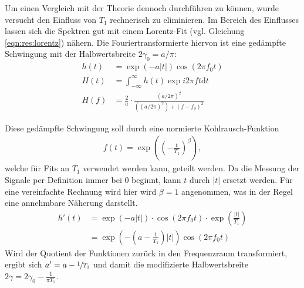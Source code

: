 Um einen Vergleich mit der Theorie dennoch durchführen zu können, wurde versucht den Einfluss von $T_1$ rechnerisch zu eliminieren. Im Bereich des Einflusses lassen sich die Spektren gut mit einem Lorentz-Fit (vgl. Gleichung \eqref{eqn:res:lorentz}) nähern. Die Fouriertransformierte hiervon ist eine gedämpfte Schwingung mit der Halbwertsbreite $2 \gamma_0 = a/\pi$:
\begin{align}
	h(t) & = \exp{(-a |t|)} \cos{(2 \pi f_0 t)} \\
	H(t) & = \int_{-\infty}^{\infty} h(t) \exp{i 2 \pi f t} \text{d} t \\
	H(f) & = \frac{2}{a} \cdot \frac{(a/2\pi)^2}{((a/2\pi)^2) + (f - f_0)^2}
\end{align}

Diese gedämpfte Schwingung soll durch eine normierte Kohlrausch-Funktion
\begin{align}
	f(t) = \exp{\left( {\left(-\frac{t}{T_1} \right)}^\beta \right) },
\end{align}
welche für Fits an $T_1$ verwendet werden kann, geteilt werden. Da die Messung der Signale per Definition immer bei 0 beginnt, kann $t$ durch $|t|$ ersetzt werden. Für eine vereinfachte Rechnung wird hier wird $\beta = 1$ angenommen, was in der Regel eine annehmbare Näherung darstellt.
\begin{align}
	h'(t) &= \exp{(-a \lvert t \rvert)} \cdot \cos{(2 \pi f_0 t)} \cdot \exp{\left(\frac{|t|}{T_1} \right)} \\
	&= \exp{\left(- \left(a - \frac{1}{T_1}\right) |t|\right)} \cos{(2 \pi f_0 t)}
\end{align}
Wird der Quotient der Funktionen zurück in den Frequenzraum transformiert, ergibt sich $a' = a - \sfrac{1}{T_1}$ und damit die modifizierte Halbwertsbreite $2\gamma = 2\gamma_0 - \frac{1}{\pi T_1}$.

